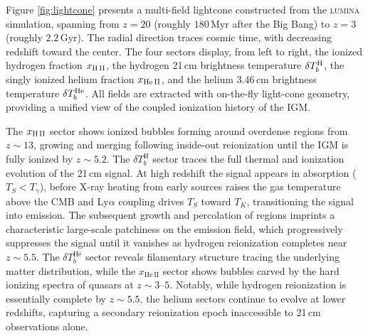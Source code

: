 \documentclass[apj,twocolumn, appendixfloats, twocolappendix, numberedappendix, tighten]{openjournal}
\DeclareRobustCommand{\lumina}{\mbox{\textsc{lumina}}\xspace}
\begin{document}
Figure \ref{fig:lightcone} presents a multi-field lightcone constructed from the \lumina simulation, spanning from $z = 20$ (roughly $180\,\mathrm{Myr}$ after the Big Bang) to $z = 3$ (roughly $2.2\,\mathrm{Gyr}$). The radial direction traces cosmic time, with decreasing redshift toward the center. The four sectors display, from left to right, the ionized hydrogen fraction $x_{\rm H\,II}$, the hydrogen 21\,cm brightness temperature $\delta T_b^{\rm H}$, the singly ionized helium fraction $x_{\rm He\,II}$, and the helium 3.46\,cm brightness temperature $\delta T_b^{\rm He}$. All fields are extracted with on-the-fly light-cone geometry, providing a unified view of the coupled ionization history of the IGM.


The $x_{\rm H\,II}$ sector shows ionized bubbles forming around overdense regions from $z \sim 13$, growing and merging following inside-out reionization until the IGM is fully ionized by $z \sim 5.2$. The $\delta T_b^\mathrm{H}$ sector traces the full thermal and ionization evolution of the 21\,cm signal. At high redshift the signal appears in absorption ($T_S < T_\gamma$), before X-ray heating from early sources raises the gas temperature above the CMB and Ly$\alpha$ coupling drives $T_S$ toward $T_K$, transitioning the signal into emission. The subsequent growth and percolation of  regions imprints a characteristic large-scale patchiness on the emission field, which progressively suppresses the signal until it vanishes as hydrogen reionization completes near $z \sim 5.5$. The $\delta T_b^\mathrm{He}$ sector reveals filamentary structure tracing the underlying matter distribution, while the $x_\mathrm{He\,II}$ sector shows  bubbles carved by the hard ionizing spectra of quasars at $z \sim 3$--$5$. Notably, while hydrogen reionization is essentially complete by $z \sim 5.5$, the helium sectors continue to evolve at lower redshifts, capturing a secondary reionization epoch inaccessible to 21\,cm observations alone.


\end{document}

